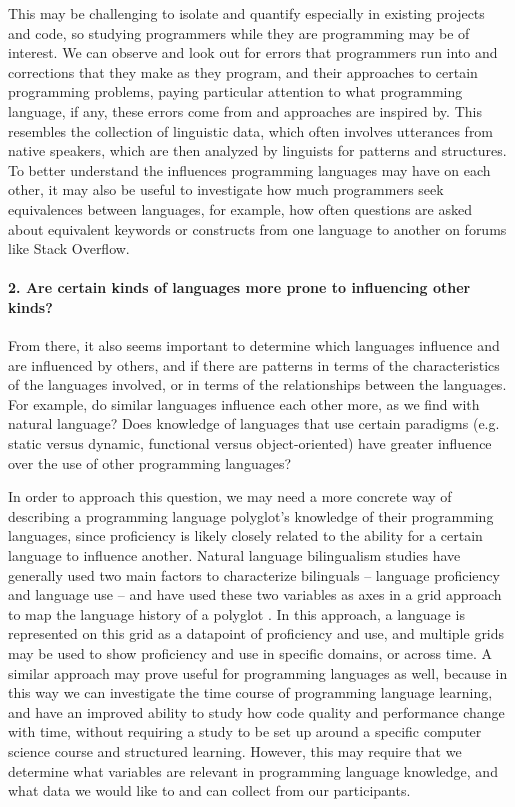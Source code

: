 \documentclass[a4paper,UKenglish,cleveref, autoref]{oasics-v2019}
\begin{document}
This may be challenging to isolate and quantify especially in existing projects and code, so studying programmers while they are programming may be of interest. We can observe and look out for errors that programmers run into and corrections that they make as they program, and their approaches to certain programming problems, paying particular attention to what programming language, if any, these errors come from and approaches are inspired by. This resembles the collection of linguistic data, which often involves utterances from native speakers, which are then analyzed by linguists for patterns and structures. To better understand the influences programming languages may have on each other, it may also be useful to investigate how much programmers seek equivalences between languages, for example, how often questions are asked about equivalent keywords or constructs from one language to another on forums like Stack Overflow. 

\paragraph*{2. Are certain kinds of languages more prone to influencing other kinds?} 

From there, it also seems important to determine which languages influence and are influenced by others, and if there are patterns in terms of the characteristics of the languages involved, or in terms of the relationships between the languages. For example, do similar languages influence each other more, as we find with natural language? Does knowledge of languages that use certain paradigms (e.g. static versus dynamic, functional versus object-oriented) have greater influence over the use of other programming languages? 

In order to approach this question, we may need a more concrete way of describing a programming language polyglot’s knowledge of their programming languages, since proficiency is likely closely related to the ability for a certain language to influence another. Natural language bilingualism studies have generally used two main factors to characterize bilinguals -- language proficiency and language use -- and have used these two variables as axes in a grid approach to map the language history of a polyglot \cite{pl0011}. In this approach, a language is represented on this grid as a datapoint of proficiency and use, and multiple grids may be used to show proficiency and use in specific domains, or across time. A similar approach may prove useful for programming languages as well, because in this way we can investigate the time course of programming language learning, and have an improved ability to study how code quality and performance change with time, without requiring a study to be set up around a specific computer science course and structured learning. However, this may require that we determine what variables are relevant in programming language knowledge, and what data we would like to and can collect from our participants.  
\end{document}
